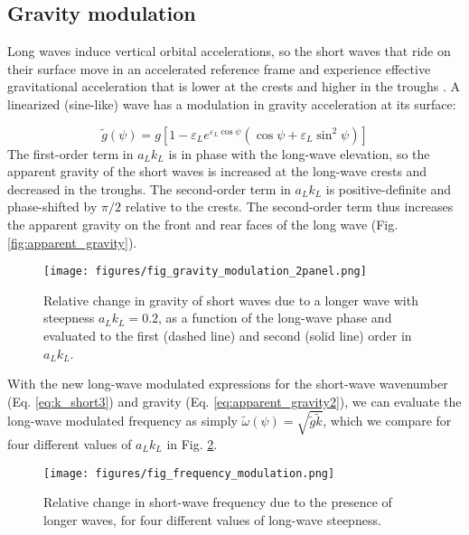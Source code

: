 \documentclass[draft]{agujournal2019}
\begin{document}
\subsection{Gravity modulation}
\label{subsection:gravity_modulation}

Long waves induce vertical orbital accelerations, so the short
waves that ride on their surface move in an accelerated reference frame and
experience effective gravitational acceleration that is lower at the crests and
higher in the troughs \cite{longuet1986eulerian,longuet1987propagation}.
A linearized (sine-like) wave has a modulation in gravity acceleration at its
surface:

\begin{equation}
\label{eq:effective_gravity}
\widetilde{g}(\psi) = g \left[
  1 - \varepsilon_L e^{\varepsilon_L \cos{\psi}} \left(
    \cos{\psi} + \varepsilon_L \sin^2{\psi}
  \right)
\right]
\end{equation}
The first-order term in $a_L k_L$ is in phase with the long-wave elevation,
so the apparent gravity of the short waves is increased at the long-wave crests
and decreased in the troughs.
The second-order term in $a_L k_L$ is positive-definite and phase-shifted by
$\pi/2$ relative to the crests.
The second-order term thus increases the apparent gravity on the front and rear
faces of the long wave (Fig. \ref{fig:apparent_gravity}).

\begin{figure}[h]
\label{fig:gravity_modulation}
\centering
\texttt{[image: figures/fig\_gravity\_modulation\_2panel.png]}
\caption{
  Relative change in gravity of short waves due to a longer wave with steepness $a_L k_L = 0.2$,
  as a function of the long-wave phase and evaluated to the first (dashed line) and second (solid line) order in $a_L k_L$.
}
\end{figure}

With the new long-wave modulated expressions for the short-wave wavenumber
(Eq. \ref{eq:k_short3}) and gravity (Eq. \ref{eq:apparent_gravity2}), we can
evaluate the long-wave modulated frequency as simply
$\widetilde{\omega}(\psi) = \sqrt{\widetilde{g} \widetilde{k}}$, which we compare
for four different values of $a_L k_L$ in Fig. \ref{fig:frequency_modulation}.

\begin{figure}[h]
\label{fig:frequency_modulation}
\centering
\texttt{[image: figures/fig\_frequency\_modulation.png]}
\caption{
  Relative change in short-wave frequency due to the presence of longer
  waves, for four different values of long-wave steepness.
}
\end{figure}
\end{document}
